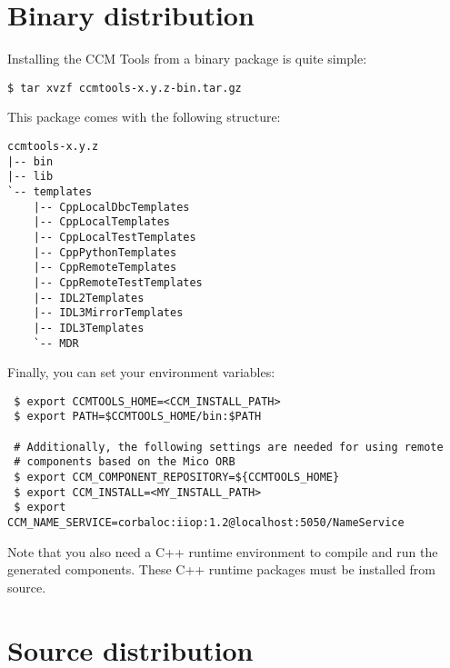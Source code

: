 \section{Binary distribution}

Installing the CCM Tools from a binary package is quite simple:
\begin{small}
\begin{verbatim}
$ tar xvzf ccmtools-x.y.z-bin.tar.gz 
\end{verbatim}
\end{small}

\noindent
This package comes with the following structure:
\begin{small}
\begin{verbatim}
ccmtools-x.y.z
|-- bin
|-- lib
`-- templates
    |-- CppLocalDbcTemplates
    |-- CppLocalTemplates
    |-- CppLocalTestTemplates
    |-- CppPythonTemplates
    |-- CppRemoteTemplates
    |-- CppRemoteTestTemplates
    |-- IDL2Templates
    |-- IDL3MirrorTemplates
    |-- IDL3Templates
    `-- MDR
\end{verbatim}
\end{small}

\noindent
Finally, you can set your environment variables:

\begin{small}
\begin{verbatim}
 $ export CCMTOOLS_HOME=<CCM_INSTALL_PATH>
 $ export PATH=$CCMTOOLS_HOME/bin:$PATH	    

 # Additionally, the following settings are needed for using remote
 # components based on the Mico ORB
 $ export CCM_COMPONENT_REPOSITORY=${CCMTOOLS_HOME} 
 $ export CCM_INSTALL=<MY_INSTALL_PATH>
 $ export CCM_NAME_SERVICE=corbaloc:iiop:1.2@localhost:5050/NameService
\end{verbatim}
\end{small}

\noindent
Note that you also need a C++ runtime environment to compile and run the
generated components.
These C++ runtime packages must be installed from source.


\newpage
\section{Source distribution}


